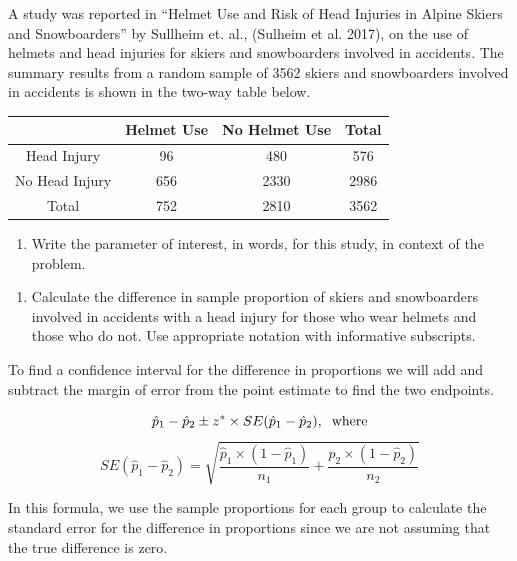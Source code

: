 \documentclass[
]{report}
\providecommand{\tightlist}{%
  \setlength{\itemsep}{0pt}\setlength{\parskip}{0pt}}
\begin{document}
\vspace{1in}

A study was reported in ``Helmet Use and Risk of Head Injuries in Alpine Skiers and Snowboarders'' by Sullheim et. al., (Sulheim et al. 2017), on the use of helmets and head injuries for skiers and snowboarders involved in accidents. The summary results from a random sample of 3562 skiers and snowboarders involved in accidents is shown in the two-way table below.

\begin{longtable}[]{@{}cccc@{}}
\toprule\noalign{}
& Helmet Use & No Helmet Use & Total \\
\midrule\noalign{}
\endhead
\bottomrule\noalign{}
\endlastfoot
Head Injury & 96 & 480 & 576 \\
No Head Injury & 656 & 2330 & 2986 \\
Total & 752 & 2810 & 3562 \\
\end{longtable}

\begin{enumerate}
\def\labelenumi{\arabic{enumi}.}
\setcounter{enumi}{1}
\tightlist
\item
  Write the parameter of interest, in words, for this study, in context of the problem.
\end{enumerate}

\vspace{0.8in}

\begin{enumerate}
\def\labelenumi{\arabic{enumi}.}
\setcounter{enumi}{2}
\tightlist
\item
  Calculate the difference in sample proportion of skiers and snowboarders involved in accidents with a head injury for those who wear helmets and those who do not. Use appropriate notation with informative subscripts.
\end{enumerate}

\vspace{0.8in}

To find a confidence interval for the difference in proportions we will add and subtract the margin of error from the point estimate to find the two endpoints.

\[\hat{p}_1-\hat{p}_2\pm z^*\times SE(\hat{p}_1-\hat{p}_2), \hspace{.2cm} \text{where}\]
\[SE(\hat{p}_1-\hat{p}_2) = \sqrt{\frac{\hat{p}_1 \times  (1-\hat{p}_1)}{n_1}+\frac{\hat{p}_2 \times  (1-\hat{p}_2)}{n_2}}\]

In this formula, we use the sample proportions for each group to calculate the standard error for the difference in proportions since we are not assuming that the true difference is zero.
\end{document}
